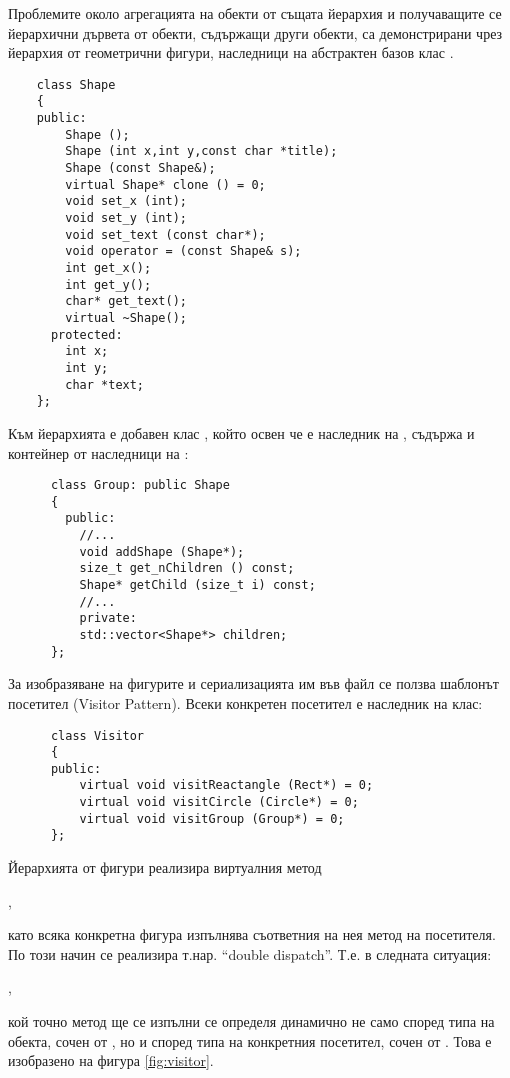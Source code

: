 \begin{mdframed}[hidealllines=true,backgroundcolor=gray!20]
  Проблемите около агрегацията на обекти от същата йерархия и получаващите се йерархични дървета от обекти, съдържащи други обекти, са демонстрирани чрез йерархия от геометрични фигури, наследници на абстрактен базов клас .
  \begin{verbatim}
    class Shape
    {
    public:
        Shape ();
        Shape (int x,int y,const char *title);
        Shape (const Shape&);
        virtual Shape* clone () = 0;    
        void set_x (int);
        void set_y (int);
        void set_text (const char*);
        void operator = (const Shape& s);
        int get_x();
        int get_y();
        char* get_text();
        virtual ~Shape();
      protected:
        int x;
        int y;
        char *text;
    };
    \end{verbatim}
    
    Към йерархията е добавен клас , който освен че е наследник на , съдържа и контейнер от наследници на :

    \begin{verbatim}
      class Group: public Shape
      {
        public:
          //...
          void addShape (Shape*);
          size_t get_nChildren () const;
          Shape* getChild (size_t i) const;
          //...
          private:
          std::vector<Shape*> children;
      };
    \end{verbatim}

    За изобразяване на фигурите и сериализацията им във файл се ползва шаблонът посетител (Visitor Pattern). Всеки конкретен посетител е наследник на клас:
    \begin{verbatim}
      class Visitor
      {
      public:
          virtual void visitReactangle (Rect*) = 0;
          virtual void visitCircle (Circle*) = 0;
          virtual void visitGroup (Group*) = 0;
      };  
    \end{verbatim}

    Йерархията от фигури реализира виртуалния метод 
    
    , 
    
    като всяка конкретна фигура изпълнява съответния на нея метод на посетителя. По този начин се реализира т.нар. ``double dispatch''. Т.е. в следната ситуация:

    ,
    
    кой точно метод ще се изпълни се определя динамично не само според типа на обекта, сочен от , но и според типа на конкретния посетител, сочен от . Това е изобразено на фигура \ref{fig:visitor}.
  \end{mdframed}

